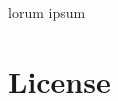 \documentclass[10pt,twocolumn,letterpaper]{article}
\begin{document}








            lorum ipsum
 

    {\small
    
    
    \nocite{*} %
    }

    \section*{License}

        \doclicenseThis
\end{document}
